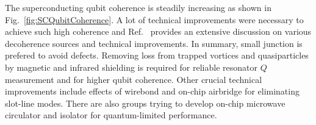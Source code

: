 \documentclass[%
groupedaddress,
showpacs,
 amsmath,amssymb,
 aps,
prb,
]{revtex4-1}
\begin{document}
The superconducting qubit coherence is steadily increasing as shown in Fig.~\ref{fig:SCQubitCoherence}. A lot of technical improvements were necessary to achieve such high coherence and Ref.~ provides an extensive discussion on various decoherence sources and technical improvements. In summary, small junction is prefered to avoid defects. Removing loss from trapped vortices and quasiparticles by magnetic\cite{Barends2011,Martinis2014Report} and infrared\cite{Corcoles2011,Barends2011} shielding is required for reliable resonator $Q$ measurement and for higher qubit coherence. Other crucial technical improvements include effects of wirebond\cite{Wenner2011} and on-chip airbridge for eliminating slot-line modes\cite{Chen2014}. There are also groups trying to develop on-chip microwave circulator and isolator for quantum-limited performance\cite{Kerckhoff2015}.








\end{document}

